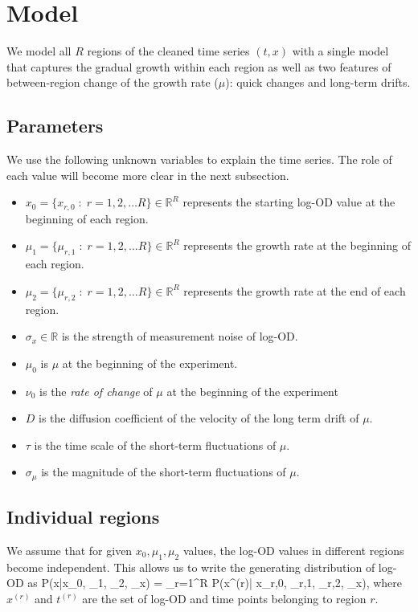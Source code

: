 \section{Model}

We model all $R$ regions of the cleaned time series $(t, x)$ with a single model that captures the gradual growth within each region as well as two features of between-region change of the growth rate ($\mu$): quick changes and long-term drifts.

\subsection{Parameters}
We use the following unknown variables to explain the time series. The role of each value will become more clear in the next subsection.
\begin{itemize}
	\item $x_0 = \{x_{r,0}\;:\;r=1,2,\ldots R\} \in \mathds{R}^R$ represents the starting log-OD value at the beginning of each region.
	\item $\mu_1 = \{\mu_{r,1}\;:\;r=1,2,\ldots R\} \in \mathds{R}^R$  represents the growth rate at the beginning of each region.
	\item $\mu_2 = \{\mu_{r,2}\;:\;r=1,2,\ldots R\} \in \mathds{R}^R$  represents the growth rate at the end of each region.
	\item $\sigma_x \in \mathds{R}$ is the strength of measurement noise of log-OD.
	\item $\mu_0$ is $\mu$ at the beginning of the experiment.
	\item $\nu_0$ is the \emph{rate of change} of $\mu$ at the beginning of the experiment
	\item $D$ is the diffusion coefficient of the velocity of the long term drift of $\mu$.
	\item $\tau$ is the time scale of the short-term fluctuations of $\mu$.
	\item $\sigma_\mu$ is the magnitude of the short-term fluctuations of $\mu$.
\end{itemize}


\subsection{Individual regions}
We assume that for given $x_0, \mu_1, \mu_2$ values, the log-OD values in different regions become independent. This allows us to write the generating distribution of log-OD as 
\be
	P(x\;|\;x_0, \mu_1, \mu_2, \sigma_x) = \prod_{r=1}^R P(x^{(r)}\;|\; x_{r,0}, \mu_{r,1}, \mu_{r,2}, \sigma_x)\quad ,
\ee
where $x^{(r)}$ and $t^{(r)}$ are the set of log-OD and time points belonging to region $r$.

